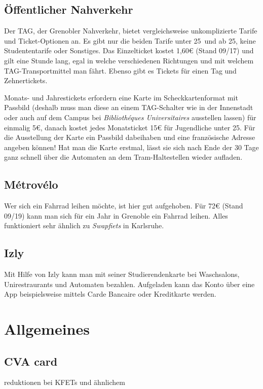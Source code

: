 \documentclass[11pt,a4paper]{article}
\begin{document}
	\subsection{Öffentlicher Nahverkehr}
	
	Der TAG, der Grenobler Nahverkehr, bietet vergleichsweise unkomplizierte Tarife und Ticket-Optionen an. Es gibt nur die beiden Tarife \glqq unter 25\grqq\ und \glqq ab 25\grqq , keine Studententarife oder Sonstiges. Das Einzelticket kostet 1,60€ (Stand 09/17) und gilt eine Stunde lang, egal in welche verschiedenen Richtungen und mit welchem TAG-Transportmittel man fährt. Ebenso gibt es Tickets für einen Tag und Zehnertickets.
	
	Monats- und Jahrestickets erfordern eine Karte im Scheckkartenformat mit Passbild (deshalb muss man diese an einem TAG-Schalter wie in der Innenstadt oder auch auf dem Campus bei \emph{Bibliothéques Universitaires} ausstellen lassen) für einmalig 5€, danach kostet jedes Monatsticket 15€ für Jugendliche unter 25. Für die Ausstellung der Karte ein Passbild dabeihaben und eine französische Adresse angeben können! Hat man die Karte erstmal, lässt sie sich nach Ende der 30 Tage ganz schnell über die Automaten an dem Tram-Haltestellen wieder aufladen.

  \subsection{Métrovélo}
  Wer sich ein Fahrrad leihen möchte, ist hier gut aufgehoben. Für 72€ (Stand 09/19) kann man sich für ein Jahr in Grenoble ein Fahrrad leihen. Alles funktioniert sehr ähnlich zu \textit{Swapfiets} in Karlsruhe.
	
	\subsection{Izly}
  Mit Hilfe von Izly kann man mit seiner Studierendenkarte bei Waschsalons, Unirestraurants und Automaten bezahlen. Aufgeladen kann das Konto über eine App beispielsweise mittels Carde Bancaire oder Kreditkarte werden. 


  \section{Allgemeines}
  \subsection{CVA card}
  reduktionen bei KFETs und ähnlichem 
\end{document}
